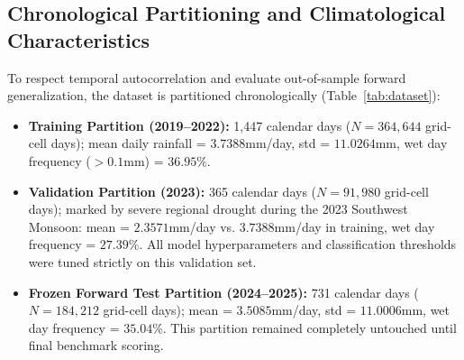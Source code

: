 \documentclass[12pt]{article}
\begin{document}
\subsection{Chronological Partitioning and Climatological Characteristics}
To respect temporal autocorrelation and evaluate out-of-sample forward generalization, the dataset is partitioned chronologically (Table~\ref{tab:dataset}):
\begin{itemize}
    \item \textbf{Training Partition (2019--2022):} 1,447 calendar days ($N = 364,644$ grid-cell days); mean daily rainfall = $3.7388$\;mm/day, std = $11.0264$\;mm, wet day frequency ($>0.1$\;mm) = $36.95\%$.
    \item \textbf{Validation Partition (2023):} 365 calendar days ($N = 91,980$ grid-cell days); marked by severe regional drought during the 2023 Southwest Monsoon: mean = $2.3571$\;mm/day vs. $3.7388$\;mm/day in training, wet day frequency = $27.39\%$. All model hyperparameters and classification thresholds were tuned strictly on this validation set.
    \item \textbf{Frozen Forward Test Partition (2024--2025):} 731 calendar days ($N = 184,212$ grid-cell days); mean = $3.5085$\;mm/day, std = $11.0006$\;mm, wet day frequency = $35.04\%$. This partition remained completely untouched until final benchmark scoring.
\end{itemize}
\end{document}
